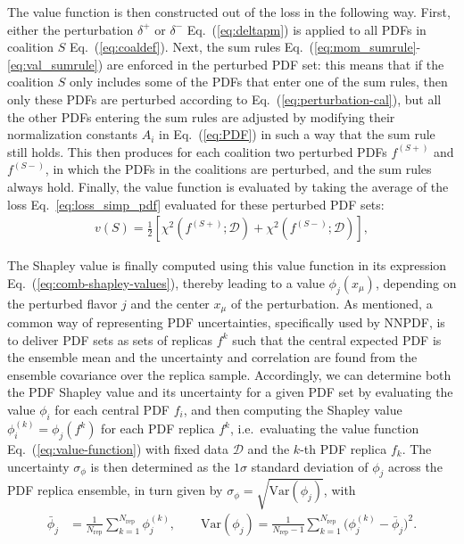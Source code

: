 \documentclass[11pt,a4paper]{article}
\begin{document}
The value function is then constructed out of the loss in the following way. First, either the perturbation $\delta^+$ or $\delta^-$ Eq.~(\ref{eq:deltapm}) is applied to all PDFs in coalition $S$ Eq.~(\ref{eq:coaldef}). Next, the sum rules Eq.~(\ref{eq:mom_sumrule}-\ref{eq:val_sumrule}) are enforced in the perturbed PDF set: this means that if the coalition $S$ only includes some of the PDFs that enter one of the sum rules, then only these PDFs are perturbed according to Eq.~(\ref{eq:perturbation-cal}), but all the other PDFs entering the sum rules are adjusted by modifying their normalization constants $A_i$ in 
Eq.~(\ref{eq:PDF}) in such a way that the sum rule still holds. This then produces for each coalition two perturbed PDFs $f^{(S+)}$ and $f^{(S-)}$, in which the PDFs in the coalitions are perturbed, and the sum rules always hold. Finally, the value function is evaluated by taking the average of the  loss   Eq.~\eqref{eq:loss_simp_pdf} evaluated for these perturbed PDF sets:
\begin{align}
\label{eq:value-function}
    v(S)=\frac{1}{2}\left[\chi^2\!\left(f^{(S+)};\mathcal{D}\right)+\chi^2\!\left(f^{(S-)};\mathcal{D}\right)\right],
\end{align}
%

The Shapley value is finally computed using this value function in its expression  Eq.~(\ref{eq:comb-shapley-values}), thereby leading to a value $\phi_j(x_\mu)$, depending on the perturbed flavor $j$ and the center $x_\mu$ of the perturbation.  As mentioned, a common way of representing PDF uncertainties, specifically used by NNPDF, is to deliver PDF sets as sets of replicas $f^k$ such that the central expected PDF is the ensemble mean and the uncertainty and correlation are found from the ensemble covariance over the replica sample. Accordingly, we can determine  both the PDF Shapley value and its uncertainty for a given PDF set by evaluating the value $\phi_i$ for each  central PDF $f_i$, and  then  computing the Shapley value  $\phi_i^{(k)}= \phi_j(f^k)$ for each PDF replica $f^k$, i.e.\ evaluating  the value function Eq.~(\ref{eq:value-function}) with fixed data $\mathcal{D}$ and  the $k$-th PDF replica $f_k$. The uncertainty $\sigma_\phi$ is then determined as the  $1\sigma$ standard deviation of $\phi_j$ across the PDF replica ensemble, in turn given by $\sigma_\phi=\sqrt{\text{Var}(\phi_j)}$, with 
\begin{align}
    \bar{\phi}_j &= \frac{1}{N_\text{rep}}\sum_{k=1}^{N_\text{rep}}\phi_j^{(k)},
    \qquad
    \text{Var}(\phi_j) = \frac{1}{N_\text{rep}-1}
    \sum_{k=1}^{N_\text{rep}}\bigl(\phi_j^{(k)}-\bar{\phi}_j\bigr)^2.
    \label{eq:uq}
\end{align}
\end{document}
